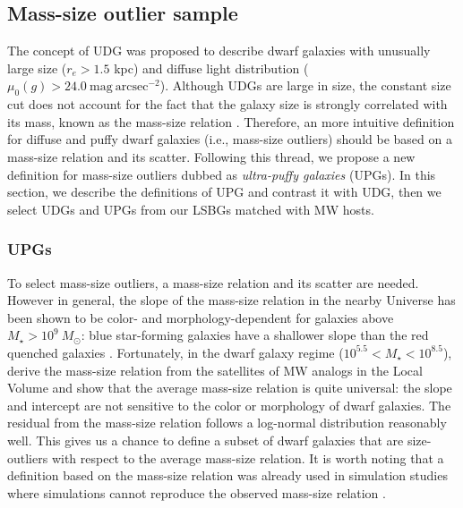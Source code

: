 \documentclass[twocolumn,astrosymb,twocolappendix]{aastex631}
\newcommand{\sbunit}{\mathrm{mag\ arcsec}^{-2}}
\newcommand{\sbcen}{\mu_{0}(g)}
\begin{document}
\begin{CJK*}{UTF8}{gbsn}
\subsection{Mass-size outlier sample}\label{sec:sample}
The concept of UDG was proposed to describe dwarf galaxies with unusually large size ($r_e>1.5$ kpc) and diffuse light distribution ($\sbcen > 24.0\ \sbunit$). Although UDGs are large in size, the constant size cut does not account for the fact that the galaxy size is strongly correlated with its mass, known as the mass-size relation \citep[e.g.,][]{Graham2003,Trujillo2007,vanDokkum2013,Cappellari2013,Lange2015}. Therefore, an more intuitive definition for diffuse and puffy dwarf galaxies (i.e., mass-size outliers) should be based on a mass-size relation and its scatter. Following this thread, we propose a new definition for mass-size outliers dubbed as \textit{ultra-puffy galaxies} (UPGs). In this section, we describe the definitions of UPG and contrast it with UDG, then we select UDGs and UPGs from our LSBGs matched with MW hosts. 

\subsubsection{UPGs}
To select mass-size outliers, a mass-size relation and its scatter are needed. However in general, the slope of the mass-size relation in the nearby Universe has been shown to be color- and morphology-dependent for galaxies above $M_\star > 10^{9}\ M_\odot$: blue star-forming galaxies have a shallower slope than the red quenched galaxies \citep[e.g.,][]{Lange2015}. Fortunately, in the dwarf galaxy regime ($10^{5.5} < M_\star < 10^{8.5}$), \citet{ELVES-I} derive the mass-size relation from the satellites of MW analogs in the Local Volume and show that the average mass-size relation is quite universal: the slope and intercept are not sensitive to the color or morphology of dwarf galaxies. The residual from the mass-size relation follows a log-normal distribution reasonably well. This gives us a chance to define a subset of dwarf galaxies that are size-outliers with respect to the average mass-size relation. It is worth noting that a definition based on the mass-size relation was already used in simulation studies where simulations cannot reproduce the observed mass-size relation \citep[e.g.,][]{Benavides2021,Benavides2022}. 


\end{CJK*}
\end{document}
